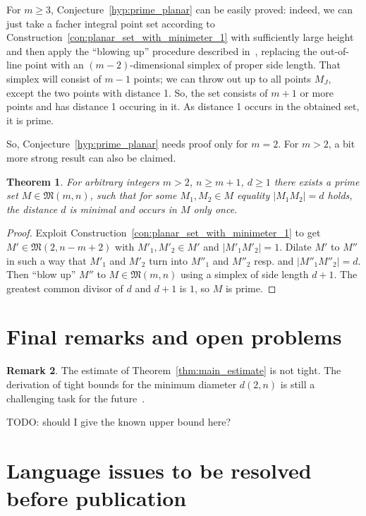 \documentclass[a4paper,14pt]{article} %
\theoremstyle{plain}
\newtheorem{theorem}{Theorem}[section]
\theoremstyle{definition}
\newtheorem{remark}[theorem]{Remark}
\begin{document}
For $m \geq 3$, Conjecture~\ref{hyp:prime_planar} can be easily proved:
indeed, we can just take a facher integral point set according to Construction~\ref{con:planar_set_with_minimeter_1}
with sufficiently large height and then apply the ``blowing up'' procedure described in~\cite[Theorem 1.3]{kurz2008bounds},
replacing the out-of-line point with an $(m-2)$-dimensional simplex of proper side length.
That simplex will consist of $m-1$ points;
we can throw out up to all points $M_J$, except the two points with distance 1.
So, the set consists of $m+1$ or more points and has distance 1 occuring in it.
As distance 1 occurs in the obtained set, it is prime.

So, Conjecture~\ref{hyp:prime_planar} needs proof only for $m=2$.
For $m>2$, a bit more strong result can also be claimed.

\begin{theorem}
	For arbitrary integers $m > 2$, $n \geq m+1$, $d \geq 1$
	there exists a prime set $M\in\mathfrak{M}(m,n)$,
	such that for some $M_1, M_2\in M$ equality $|M_1 M_2| = d$ holds,
	the distance $d$ is minimal and occurs in $M$ only once.
\end{theorem}

\begin{proof}
	Exploit Construction~\ref{con:planar_set_with_minimeter_1} to get $M'\in \mathfrak{M}(2,n-m+2)$
	with $M'_1, M'_2 \in M'$ and $|M'_1 M'_2| = 1$.
	Dilate $M'$ to $M''$ in such a way that $M'_1$ and $M'_2$ turn into $M''_1$ and $M''_2$ resp.
	and $|M''_1 M''_2| = d$.
	Then ``blow up'' $M''$ to $M\in \mathfrak{M}(m,n)$ using a simplex of side length $d+1$.
	The greatest common divisor of $d$ and $d+1$ is $1$, so $M$ is prime.
\end{proof}


\section{Final remarks and open problems}

\begin{remark}
	The estimate of Theorem~\ref{thm:main_estimate} is not tight.
	The derivation of tight bounds for the minimum diameter $d(2, n)$
	is still a challenging task for the future~\cite[Section 7]{kurz2008minimum}.
\end{remark}
TODO: should I give the known upper bound here?


\section{Language issues to be resolved before publication}
\end{document}
